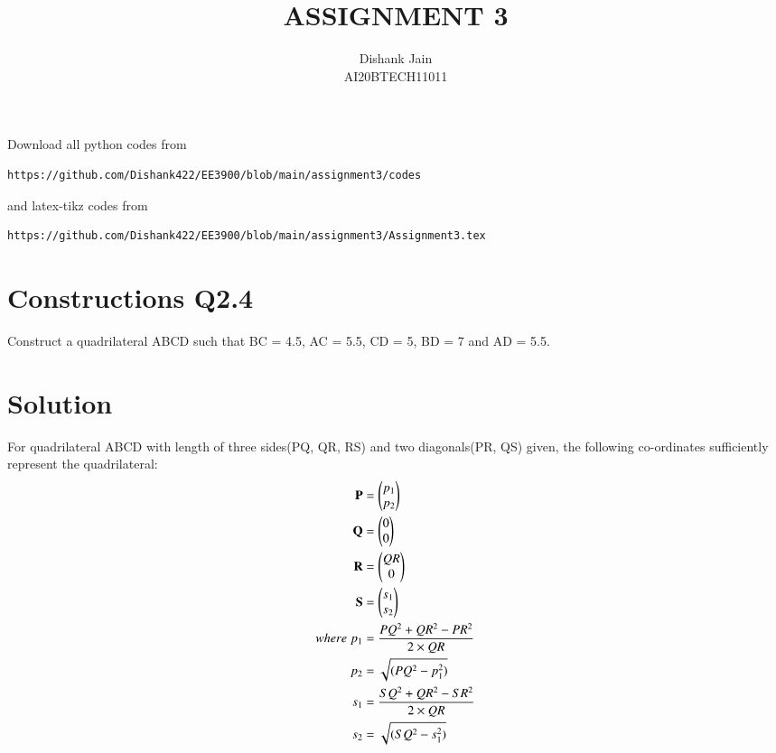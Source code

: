 \documentclass[journal,12pt,twocolumn]{IEEEtran}
\begin{document}
     \def\centbox#1{\makebox[0in]{#1}}
     \def\topbox#1{\raisebox{-\baselineskip}[0in][0in]{#1}}
     \def\midbox#1{\raisebox{-0.5\baselineskip}[0in][0in]{#1}}
\vspace{3cm}
\title{ASSIGNMENT 3}
\author{Dishank Jain \\ AI20BTECH11011}
\maketitle
\newpage
\bigskip
\renewcommand{\thefigure}{\theenumi}
\renewcommand{\thetable}{\theenumi}
Download all python codes from 
\begin{lstlisting}
https://github.com/Dishank422/EE3900/blob/main/assignment3/codes
\end{lstlisting}
%
and latex-tikz codes from 
%
\begin{lstlisting}
https://github.com/Dishank422/EE3900/blob/main/assignment3/Assignment3.tex
\end{lstlisting}
%
\section{Constructions Q2.4}
Construct a quadrilateral ABCD such that BC = 4.5, AC = 5.5, CD = 5, BD = 7  and AD = 5.5.
\section{Solution}
\begin{lemma}
    For quadrilateral ABCD with length of three sides(PQ, QR, RS) and two diagonals(PR, QS) given, the following co-ordinates sufficiently represent the quadrilateral:
    \begin{align}
        \mathbf{P} &= \begin{pmatrix}p_1\\p_2\end{pmatrix}\\
        \mathbf{Q} &= \begin{pmatrix}0\\0\end{pmatrix}\\
        \mathbf{R} &= \begin{pmatrix}QR\\0\end{pmatrix}\\
        \mathbf{S} &= \begin{pmatrix}s_1\\s_2\end{pmatrix}\\
        where\; p_1 &= \dfrac{PQ^2+QR^2-PR^2}{2\times QR}\\
        p_2 &= \sqrt{(PQ^2-p_1^2)}\\
        s_1 &= \dfrac{SQ^2+QR^2-SR^2}{2\times QR}\\
        s_2 &= \sqrt{(SQ^2-s_1^2)}
    \end{align}
\end{lemma}
    
\end{document}
